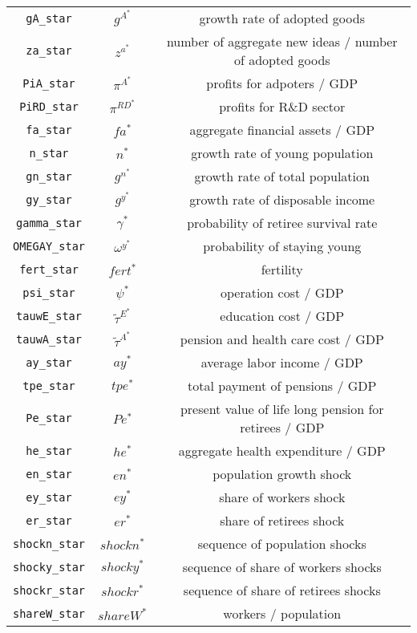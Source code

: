 \begin{center}
\begin{longtable}{ccc}
\texttt{gA\_star} & ${g^A^*}$ & growth rate of adopted goods\\
\texttt{za\_star} & ${z^a^*}$ & number of aggregate new ideas / number of adopted goods\\
\texttt{PiA\_star} & ${\pi^A^*}$ & profits for adpoters / GDP\\
\texttt{PiRD\_star} & ${\pi^{RD}^*}$ & profits for R\&D sector\\
\texttt{fa\_star} & ${fa^*}$ & aggregate financial assets / GDP\\
\texttt{n\_star} & ${n^*}$ & growth rate of young population\\
\texttt{gn\_star} & ${g^n^*}$ & growth rate of total population\\
\texttt{gy\_star} & ${g^y^*}$ & growth rate of disposable income\\
\texttt{gamma\_star} & ${\gamma^*}$ & probability of retiree survival rate\\
\texttt{OMEGAY\_star} & ${\omega^y^*}$ & probability of staying young\\
\texttt{fert\_star} & ${fert^*}$ & fertility\\
\texttt{psi\_star} & ${\psi^*}$ & operation cost / GDP\\
\texttt{tauwE\_star} & $\tilde{\tau}^E^*$ & education cost / GDP\\
\texttt{tauwA\_star} & $\tilde{\tau}^A^*$ & pension and health care cost / GDP\\
\texttt{ay\_star} & ${ay^*}$ & average labor income / GDP\\
\texttt{tpe\_star} & ${tpe^*}$ & total payment of pensions / GDP\\
\texttt{Pe\_star} & ${Pe^*}$ & present value of life long pension for retirees / GDP\\
\texttt{he\_star} & ${he^*}$ & aggregate health expenditure / GDP\\
\texttt{en\_star} & ${en^*}$ & population growth shock\\
\texttt{ey\_star} & ${ey^*}$ & share of workers shock\\
\texttt{er\_star} & ${er^*}$ & share of retirees shock\\
\texttt{shockn\_star} & ${shockn^*}$ & sequence of population shocks\\
\texttt{shocky\_star} & ${shocky^*}$ & sequence of share of workers shocks\\
\texttt{shockr\_star} & ${shockr^*}$ & sequence of share of retirees shocks\\
\texttt{shareW\_star} & ${shareW^*}$ & workers / population\\

\end{longtable}
\end{center}

